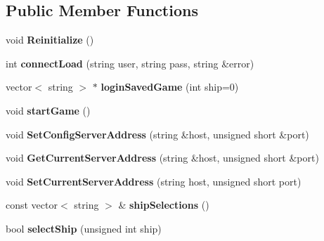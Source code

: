 \subsection*{Public Member Functions}
\begin{DoxyCompactItemize}
\item 
void {\bfseries Reinitialize} ()\hypertarget{classNetClient_aa2eb23b1af5cf5f150632398b7abd1cd}{}\label{classNetClient_aa2eb23b1af5cf5f150632398b7abd1cd}

\item 
int {\bfseries connect\+Load} (string user, string pass, string \&error)\hypertarget{classNetClient_ac5caed71ad872b8042e252ca05026049}{}\label{classNetClient_ac5caed71ad872b8042e252ca05026049}

\item 
vector$<$ string $>$ $\ast$ {\bfseries login\+Saved\+Game} (int ship=0)\hypertarget{classNetClient_a35f160939eea3b9dc71e173a3b4f28d5}{}\label{classNetClient_a35f160939eea3b9dc71e173a3b4f28d5}

\item 
void {\bfseries start\+Game} ()\hypertarget{classNetClient_afab3e781d1131077848628465e448218}{}\label{classNetClient_afab3e781d1131077848628465e448218}

\item 
void {\bfseries Set\+Config\+Server\+Address} (string \&host, unsigned short \&port)\hypertarget{classNetClient_ae033c4060c2619feec4fb89d072fa312}{}\label{classNetClient_ae033c4060c2619feec4fb89d072fa312}

\item 
void {\bfseries Get\+Current\+Server\+Address} (string \&host, unsigned short \&port)\hypertarget{classNetClient_a6452d3b8c00c7678d1926218140ffe4b}{}\label{classNetClient_a6452d3b8c00c7678d1926218140ffe4b}

\item 
void {\bfseries Set\+Current\+Server\+Address} (string host, unsigned short port)\hypertarget{classNetClient_ace647c9a87821a09d4cc02375afed825}{}\label{classNetClient_ace647c9a87821a09d4cc02375afed825}

\item 
const vector$<$ string $>$ \& {\bfseries ship\+Selections} ()\hypertarget{classNetClient_ad89747b3ebd72f30c171c01cf6ac0a1c}{}\label{classNetClient_ad89747b3ebd72f30c171c01cf6ac0a1c}

\item 
bool {\bfseries select\+Ship} (unsigned int ship)\hypertarget{classNetClient_a92abd336a76ba81dc788d206bb2670d4}{}\label{classNetClient_a92abd336a76ba81dc788d206bb2670d4}


\end{DoxyCompactItemize}
